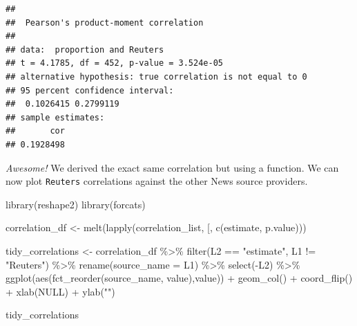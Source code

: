 \documentclass[
]{article}
\newenvironment{Shaded}{\begin{snugshade}}{\end{snugshade}}
\newcommand{\AttributeTok}[1]{\textcolor[rgb]{0.77,0.63,0.00}{#1}}
\newcommand{\ConstantTok}[1]{\textcolor[rgb]{0.00,0.00,0.00}{#1}}
\newcommand{\FunctionTok}[1]{\textcolor[rgb]{0.00,0.00,0.00}{#1}}
\newcommand{\NormalTok}[1]{#1}
\newcommand{\OtherTok}[1]{\textcolor[rgb]{0.56,0.35,0.01}{#1}}
\newcommand{\SpecialCharTok}[1]{\textcolor[rgb]{0.00,0.00,0.00}{#1}}
\newcommand{\StringTok}[1]{\textcolor[rgb]{0.31,0.60,0.02}{#1}}
\begin{document}
\begin{verbatim}
## 
##  Pearson's product-moment correlation
## 
## data:  proportion and Reuters
## t = 4.1785, df = 452, p-value = 3.524e-05
## alternative hypothesis: true correlation is not equal to 0
## 95 percent confidence interval:
##  0.1026415 0.2799119
## sample estimates:
##       cor 
## 0.1928498
\end{verbatim}

\emph{Awesome!} We derived the exact same correlation but using a
function. We can now plot \texttt{Reuters} correlations against the
other News source providers.

\begin{Shaded}
\begin{Highlighting}[]
\FunctionTok{library}\NormalTok{(reshape2)}
\FunctionTok{library}\NormalTok{(forcats)}

\NormalTok{correlation\_df }\OtherTok{\textless{}{-}} \FunctionTok{melt}\NormalTok{(}\FunctionTok{lapply}\NormalTok{(correlation\_list, }\StringTok{\textasciigrave{}}\AttributeTok{[}\StringTok{\textasciigrave{}}\NormalTok{, }\FunctionTok{c}\NormalTok{(}\StringTok{\textquotesingle{}estimate\textquotesingle{}}\NormalTok{, }\StringTok{\textquotesingle{}p.value\textquotesingle{}}\NormalTok{)))}

\NormalTok{tidy\_correlations }\OtherTok{\textless{}{-}}\NormalTok{ correlation\_df }\SpecialCharTok{\%\textgreater{}\%}
                     \FunctionTok{filter}\NormalTok{(L2 }\SpecialCharTok{==} \StringTok{"estimate"}\NormalTok{, L1 }\SpecialCharTok{!=} \StringTok{"Reuters"}\NormalTok{) }\SpecialCharTok{\%\textgreater{}\%}
                     \FunctionTok{rename}\NormalTok{(}\AttributeTok{source\_name =}\NormalTok{ L1) }\SpecialCharTok{\%\textgreater{}\%}
                     \FunctionTok{select}\NormalTok{(}\SpecialCharTok{{-}}\NormalTok{L2) }\SpecialCharTok{\%\textgreater{}\%}
                     \FunctionTok{ggplot}\NormalTok{(}\FunctionTok{aes}\NormalTok{(}\FunctionTok{fct\_reorder}\NormalTok{(source\_name, value),value)) }\SpecialCharTok{+}
                     \FunctionTok{geom\_col}\NormalTok{() }\SpecialCharTok{+} 
                     \FunctionTok{coord\_flip}\NormalTok{() }\SpecialCharTok{+} 
                     \FunctionTok{xlab}\NormalTok{(}\ConstantTok{NULL}\NormalTok{) }\SpecialCharTok{+}
                     \FunctionTok{ylab}\NormalTok{(}\StringTok{""}\NormalTok{)}

\NormalTok{tidy\_correlations}
\end{Highlighting}
\end{Shaded}
\end{document}
